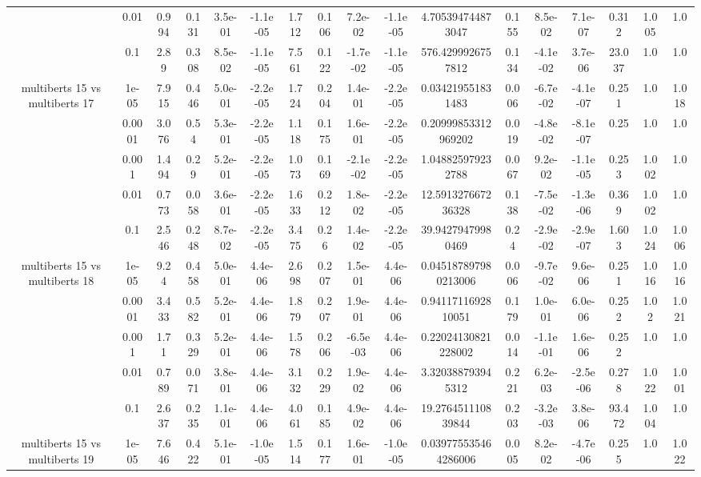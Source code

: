 \begin{tabular}{|c|c|c|c|c|c|c|c|c|c|c|c|c|c|c|c|c|}
 & 0.01 & 0.994 & 0.131 & 3.5e-01 & -1.1e-05 & 1.712 & 0.106 & 7.2e-02 & -1.1e-05 & 4.705394744873047 & 0.155 & 8.5e-02 & 7.1e-07 & 0.312 & 1.005 & 1.0 \\
 & 0.1 & 2.89 & 0.308 & 8.5e-02 & -1.1e-05 & 7.561 & 0.122 & -1.7e-02 & -1.1e-05 & 576.4299926757812 & 0.134 & -4.1e-02 & 3.7e-06 & 23.037 & 1.0 & 1.0 \\
\hline
\multirow{5}{*}{multiberts 15 vs multiberts 17} & 1e-05 & 7.915 & 0.446 & 5.0e-01 & -2.2e-05 & 1.724 & 0.204 & 1.4e-01 & -2.2e-05 & 0.034219551831483 & 0.006 & -6.7e-02 & -4.1e-07 & 0.251 & 1.0 & 1.018 \\
 & 0.0001 & 3.076 & 0.54 & 5.3e-01 & -2.2e-05 & 1.118 & 0.175 & 1.6e-01 & -2.2e-05 & 0.20999853312969202 & 0.019 & -4.8e-02 & -8.1e-07 & 0.25 & 1.0 & 1.0 \\
 & 0.001 & 1.494 & 0.29 & 5.2e-01 & -2.2e-05 & 1.073 & 0.169 & -2.1e-02 & -2.2e-05 & 1.048825979232788 & 0.067 & 9.2e-02 & -1.1e-05 & 0.253 & 1.002 & 1.0 \\
 & 0.01 & 0.773 & 0.058 & 3.6e-01 & -2.2e-05 & 1.633 & 0.212 & 1.8e-02 & -2.2e-05 & 12.591327667236328 & 0.138 & -7.5e-02 & -1.3e-06 & 0.369 & 1.002 & 1.0 \\
 & 0.1 & 2.546 & 0.248 & 8.7e-02 & -2.2e-05 & 3.475 & 0.26 & 1.4e-02 & -2.2e-05 & 39.94279479980469 & 0.24 & -2.9e-02 & -2.9e-07 & 1.603 & 1.024 & 1.006 \\
\hline
\multirow{5}{*}{multiberts 15 vs multiberts 18} & 1e-05 & 9.24 & 0.458 & 5.0e-01 & 4.4e-06 & 2.698 & 0.207 & 1.5e-01 & 4.4e-06 & 0.045187897980213006 & 0.006 & -9.7e-02 & 9.6e-06 & 0.251 & 1.016 & 1.016 \\
 & 0.0001 & 3.433 & 0.582 & 5.2e-01 & 4.4e-06 & 1.879 & 0.207 & 1.9e-01 & 4.4e-06 & 0.9411711692810051 & 0.179 & 1.0e-01 & 6.0e-06 & 0.252 & 1.02 & 1.021 \\
 & 0.001 & 1.71 & 0.329 & 5.2e-01 & 4.4e-06 & 1.578 & 0.206 & -6.5e-03 & 4.4e-06 & 0.22024130821228002 & 0.014 & -1.1e-01 & 1.6e-06 & 0.252 & 1.0 & 1.0 \\
 & 0.01 & 0.789 & 0.071 & 3.8e-01 & 4.4e-06 & 3.132 & 0.229 & 1.9e-02 & 4.4e-06 & 3.320388793945312 & 0.221 & 6.2e-03 & -2.5e-06 & 0.278 & 1.022 & 1.001 \\
 & 0.1 & 2.637 & 0.235 & 1.1e-01 & 4.4e-06 & 4.061 & 0.185 & 4.9e-02 & 4.4e-06 & 19.276451110839844 & 0.203 & -3.2e-03 & 3.8e-06 & 93.472 & 1.004 & 1.0 \\
\hline
\multirow{5}{*}{multiberts 15 vs multiberts 19} & 1e-05 & 7.646 & 0.422 & 5.1e-01 & -1.0e-05 & 1.514 & 0.177 & 1.6e-01 & -1.0e-05 & 0.039775535464286006 & 0.005 & 8.2e-02 & -4.7e-06 & 0.255 & 1.0 & 1.022 \\

\end{tabular}
